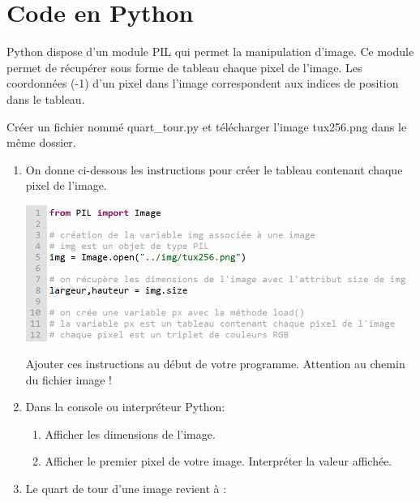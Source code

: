 \documentclass[11pt,a4paper]{article}
\newcounter{num}
\newcounter{rem}
\begin{document}
\newpage

\section*{Code en Python}

Python dispose d'un module \textsf{PIL} qui permet la manipulation d'image. Ce module permet de récupérer sous forme de tableau chaque pixel de l'image. Les coordonnées (-1) d'un pixel dans l'image correspondent aux indices de position dans le tableau. 

Créer un fichier nommé \textsf{quart\_tour.py} et télécharger l'image \textsf{tux256.png} dans le même dossier.


\begin{enumerate}

\item On donne ci-dessous les instructions pour créer le tableau contenant chaque pixel de l'image.

\begin{flushleft}
\includegraphics[scale=0.8]{../img/module_pil.png}
\end{flushleft}

Ajouter ces instructions au début de votre programme. Attention au chemin du fichier image !

\item Dans la console ou interpréteur Python:

\begin{enumerate}

\item Afficher les dimensions de l'image.

\item Afficher le premier pixel de votre image. Interpréter la valeur affichée.

\end{enumerate}

\item Le quart de tour d'une image revient à :

\begin{itemize}


\end{itemize}
\end{enumerate}
\end{document}
